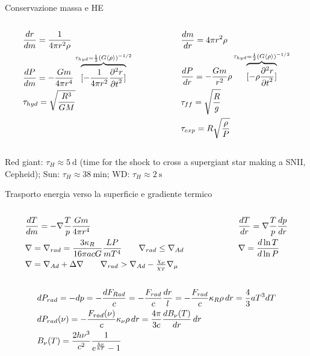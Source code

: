 \begin{frame}{Conservazione massa e HE}
\begin{columns}[T]
	\begin{column}{0.5\textwidth}
\begin{align*}
&\TDy{m}{r}=\frac{1}{4\pi r^2\rho}\\
&\TDy{m}{P}=-\frac{Gm}{4\pi r^4}\overbrace{[-\frac{1}{4\pi r^2}\PtwoDy{t}{r}]}^{\tau_{hyd}=\frac{1}{2}(G\exv{\rho})\expy{-1/2}}\\
&\tau_{hyd}=\sqrt{\frac{R^3}{GM}}
\end{align*}
\end{column}\begin{column}{0.5\textwidth}
\begin{align*}
&\TDy{r}{m}=4\pi r^2\rho\\
&\TDy{r}{P}=-\frac{Gm}{r^2}\rho\overbrace{[-\rho\PtwoDy{t}{r}]}^{\tau_{hyd}=\frac{1}{2}(G\exv{\rho})\expy{-1/2}}\\
&\tau_{ff}=\sqrt{\frac{R}{g}}\\
&\tau_{exp}=R\sqrt{\frac{\rho}{P}}
\end{align*}
\end{column}
\end{columns}
Red giant: $\tau_H\approx\SI{5}{\day}$ (time for the shock to cross a supergiant star making a SNII, Cepheid); Sun: $\tau_H\approx\SI{38}{\minute}$; WD: $\tau_H\approx\SI{2}{\second}$
\end{frame}

\begin{frame}{Trasporto energia verso la superficie e gradiente termico}
\begin{columns}[T]
	\begin{column}{0.6\textwidth}
		\begin{align*}
		&\TDy{m}{T}=-\nabla\frac{T}{p}\frac{Gm}{4\pi r^4}\\
		&\nabla=\nrad=\frac{3\kappa_R}{16\pi acG}\frac{LP}{mT^4}\tag*{$\nrad\leq\nad$}\\
		&\nabla=\nad+\Delta\nabla\tag*{$\nrad>\nad-\frac{\chi_{\mu}}{\chi_T}\nmu$}
		\end{align*}
	\end{column}\begin{column}{0.4\textwidth}
		\begin{align*}
		&\TDy{r}{T}=\nabla\frac{T}{p}\TDy{r}{p}\\
		&\nabla=\TDly{P}{T}
		\end{align*}
	\end{column}
\end{columns}
\begin{align*}
&dP_{rad}=-dp=-\frac{dF_{Rad}}{c}=-\frac{F_{rad}}{c}\frac{dr}{l}=-\frac{F_{rad}}{c}\kappa_R\rho\,dr=\frac{4}{3}aT^3dT\\
&dP_{rad}(\nu)=-\frac{F_{rad}(\nu)}{c}\kappa_{\nu}\rho\,dr=\frac{4\pi}{3c}\TDy{r}{B_{\nu}(T)}\,dr\\
&B_{\nu}(T)=\frac{2h\nu^3}{c^2}\frac{1}{\exp{\frac{h\nu}{kT}}-1}
\end{align*}
\end{frame}

